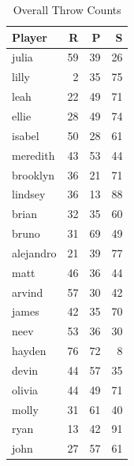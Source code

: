 \documentclass[12pt]{article}
\begin{document}
\begin{multicols}{2}

\begin{table}[H]
\centering
\caption{Overall Throw Counts}
\label{tab:overall_counts}
\begin{tabular}{lrrr}
\toprule
\textbf{Player} & \textbf{R} & \textbf{P} & \textbf{S} \\
\midrule
julia & 59 & 39 & 26 \\
lilly & 2 & 35 & 75 \\
leah & 22 & 49 & 71 \\
ellie & 28 & 49 & 74 \\
isabel & 50 & 28 & 61 \\
meredith & 43 & 53 & 44 \\
brooklyn & 36 & 21 & 71 \\
lindsey & 36 & 13 & 88 \\
brian & 32 & 35 & 60 \\
bruno & 31 & 69 & 49 \\
alejandro & 21 & 39 & 77 \\
matt & 46 & 36 & 44 \\
arvind & 57 & 30 & 42 \\
james & 42 & 35 & 70 \\
neev & 53 & 36 & 30 \\
hayden & 76 & 72 & 8 \\
devin & 44 & 57 & 35 \\
olivia & 44 & 49 & 71 \\
molly & 31 & 61 & 40 \\
ryan & 13 & 42 & 91 \\
john & 27 & 57 & 61 \\
\bottomrule
\end{tabular}
\end{table}


\end{multicols}
\end{document}
